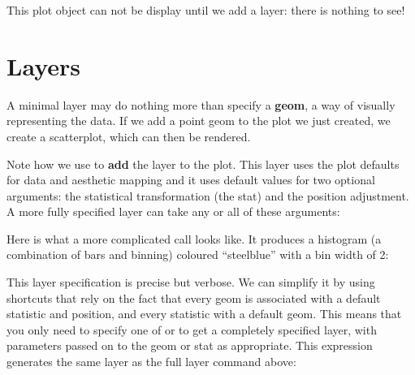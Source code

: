 % 


This plot object can not be display until we add a layer: there is nothing to see!

\section{Layers}
\label{sec:layers}

A minimal layer may do nothing more than specify a {\bf geom}, a way of visually representing the data.  If we add a point geom to the plot we just created, we create a scatterplot, which can then be rendered.

% 


\noindent Note how we use \code{+} to \textbf{add} the layer to the plot.  This layer uses the plot defaults for data and aesthetic mapping and it uses default values for two optional arguments: the statistical transformation (the stat) and the position adjustment.  A more fully specified layer can take any or all of these arguments:

% 


\noindent Here is what a more complicated call looks like.  It produces a histogram (a combination of bars and binning) coloured ``steelblue'' with a bin width of 2:

% 


\noindent  This layer specification is precise but verbose. We can simplify it by using shortcuts that rely on the fact that every geom is associated with a default statistic and position, and every statistic with a default geom.  This means that you only need to specify one of  or  to get a completely specified layer, with parameters passed on to the geom or stat as appropriate.  This expression generates the same layer as the full layer command above:

% 


